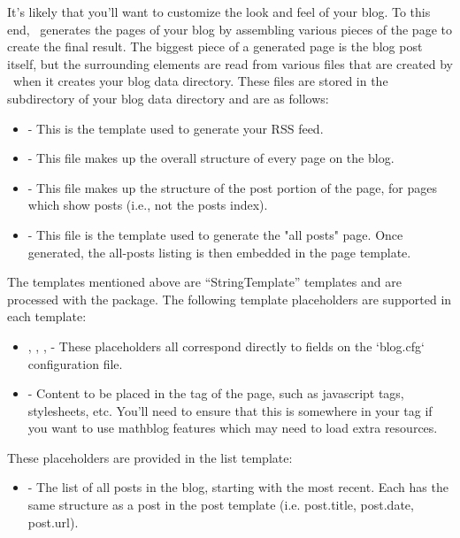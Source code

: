 \documentclass[11pt, letterpaper, oneside, titlepage]{book}
\begin{document}
It's likely that you'll want to customize the look and feel of your
blog.  To this end, \mathblog\ generates the pages of your blog by
assembling various pieces of the page to create the final result.  The
biggest piece of a generated page is the blog post itself, but the
surrounding elements are read from various files that are created by
\mathblog\ when it creates your blog data directory.  These files are
stored in the  subdirectory of your blog data directory
and are as follows:

\begin{itemize}
\item{ - This is the template used to
  generate your RSS feed.}
\item{ - This file makes up the
  overall structure of every page on the blog.}
\item{ - This file makes up the
  structure of the post portion of the page, for pages which show
  posts (i.e., not the posts index).}
\item{ - This file is the template
  used to generate the "all posts" page.  Once generated, the
  all-posts listing is then embedded in the page template.}
\end{itemize}

The templates mentioned above are ``StringTemplate'' templates and are
processed with the  package.  The following
template placeholders are supported in each template:

\begin{itemize}
\item{, , ,
   - These placeholders all correspond directly to
  fields on the `blog.cfg` configuration file.}
\item{ - Content to be placed in the 
  tag of the page, such as javascript tags, stylesheets, etc.  You'll
  need to ensure that this is somewhere in your  tag if you
  want to use mathblog features which may need to load extra
  resources.}
\end{itemize}

These placeholders are provided in the list template:

\begin{itemize}
\item{ - The list of all posts in the blog, starting with
  the most recent.  Each has the same structure as a post in the post
  template (i.e. post.title, post.date, post.url).}
\end{itemize}
\end{document}
